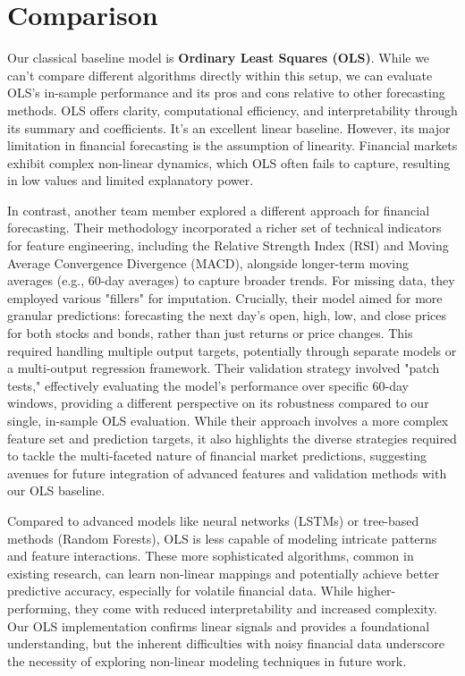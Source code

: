 \documentclass[conference]{IEEEtran}
\begin{document}
\section{Comparison}  

Our classical baseline model is \textbf{Ordinary Least Squares (OLS)}. While we can't compare different algorithms directly within this setup, we can evaluate OLS's in-sample performance and its pros and cons relative to other forecasting methods.  OLS offers clarity, computational efficiency, and interpretability through its summary and coefficients. It's an excellent linear baseline. However, its major limitation in financial forecasting is the assumption of linearity. Financial markets exhibit complex non-linear dynamics, which OLS often fails to capture, resulting in low values and limited explanatory power.

In contrast, another team member explored a different approach for financial forecasting. Their methodology incorporated a richer set of technical indicators for feature engineering, including the Relative Strength Index (RSI) and Moving Average Convergence Divergence (MACD), alongside longer-term moving averages (e.g., 60-day averages) to capture broader trends. For missing data, they employed various "fillers" for imputation. Crucially, their model aimed for more granular predictions: forecasting the next day's open, high, low, and close prices for both stocks and bonds, rather than just returns or price changes. This required handling multiple output targets, potentially through separate models or a multi-output regression framework. Their validation strategy involved "patch tests," effectively evaluating the model's performance over specific 60-day windows, providing a different perspective on its robustness compared to our single, in-sample OLS evaluation. While their approach involves a more complex feature set and prediction targets, it also highlights the diverse strategies required to tackle the multi-faceted nature of financial market predictions, suggesting avenues for future integration of advanced features and validation methods with our OLS baseline.

Compared to advanced models like neural networks (LSTMs) or tree-based methods (Random Forests), OLS is less capable of modeling intricate patterns and feature interactions. These more sophisticated algorithms, common in existing research, can learn non-linear mappings and potentially achieve better predictive accuracy, especially for volatile financial data. While higher-performing, they come with reduced interpretability and increased complexity. Our OLS implementation confirms linear signals and provides a foundational understanding, but the inherent difficulties with noisy financial data underscore the necessity of exploring non-linear modeling techniques in future work.
\end{document}
